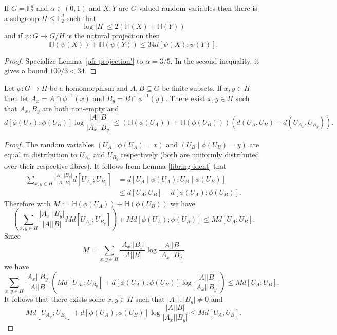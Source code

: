 \begin{lemma}\label{pfr-projection}\leanok
If $G=\mathbb{F}_2^d$ and $\alpha\in (0,1)$ and $X,Y$ are $G$-valued random
variables then there is a subgroup $H\leq \mathbb{F}_2^d$ such that
\[\log \lvert H\rvert \leq 2 (\mathbb{H}(X)+\mathbb{H}(Y))\]
and if $\psi:G \to G/H$ is the natural projection then
\[\mathbb{H}(\psi(X))+\mathbb{H}(\psi(Y))\leq 34 d[\psi(X);\psi(Y)].\]
\end{lemma}
\begin{proof}
Specialize Lemma~\ref{pfr-projection'} to $\alpha=3/5$. In the second
inequality, it gives a bound $100/3 < 34$.
\end{proof}



\begin{lemma}\label{single-fibres}\leanok
Let $\phi:G\to H$ be a homomorphism and $A,B\subseteq G$ be finite subsets. If $x,y\in H$ then let $A_x=A\cap \phi^{-1}(x)$ and $B_y=B\cap \phi^{-1}(y)$. There exist $x,y\in H$ such that $A_x,B_y$ are both non-empty and
\[d[\phi(U_A);\phi(U_B)]\log \frac{\lvert A\rvert\lvert B\rvert}{\lvert A_x\rvert\lvert B_y\rvert}\leq (\mathbb{H}(\phi(U_A))+\mathbb{H}(\phi(U_B)))(d(U_A,U_B)-d(U_{A_x},U_{B_y})).\]
\end{lemma}
\begin{proof}
\leanok
The random variables $(U_A\mid \phi(U_A)=x)$ and $(U_B\mid \phi(U_B)=y)$ are equal in distribution to $U_{A_x}$ and $U_{B_y}$ respectively (both are uniformly distributed over their respective fibres). It follows from Lemma \ref{fibring-ident} that
\begin{align*}
\sum_{x,y\in H}\frac{\lvert A_x\rvert\lvert B_y\rvert}{\lvert A\rvert\lvert B\rvert}d[U_{A_x};U_{B_y}]
&=d[U_A\mid \phi(U_A); U_B\mid \phi(U_B)]\\
&\leq d[U_A;U_B]-d[\phi(U_A);\phi(U_B)].
\end{align*}
Therefore with $M:=\mathbb{H}(\phi(U_A))+\mathbb{H}(\phi(U_B))$ we have
\[\left(\sum_{x,y\in H}\frac{\lvert A_x\rvert\lvert B_y\rvert}{\lvert A\rvert\lvert B\rvert}Md[U_{A_x};U_{B_y}]\right)+Md[\phi(U_A);\phi(U_B)]\leq Md[U_A;U_B].\]
Since
\[M=\sum_{x,y\in H}\frac{\lvert A_x\rvert\lvert B_y\rvert}{\lvert A\rvert\lvert B\rvert}\log \frac{\lvert A\rvert\lvert B\rvert}{\lvert A_x\rvert\lvert B_y\rvert}\]
we have
\[\sum_{x,y\in H} \frac{\lvert A_x\rvert\lvert B_y\rvert}{\lvert A\rvert\lvert B\rvert}\left(Md[U_{A_x};U_{B_y}]+d[\phi(U_A);\phi(U_B)]\log \frac{\lvert A\rvert\lvert B\rvert}{\lvert A_x\rvert\lvert B_y\rvert}\right)\leq  Md[U_A;U_B].\]
It follows that there exists some $x,y\in H$ such that $\lvert A_x\rvert,\lvert B_y\rvert\neq 0$ and
\[Md[U_{A_x};U_{B_y}]+d[\phi(U_A);\phi(U_B)]\log \frac{\lvert A\rvert\lvert B\rvert}{\lvert A_x\rvert\lvert B_y\rvert}\leq  Md[U_A;U_B].\]
\end{proof}


